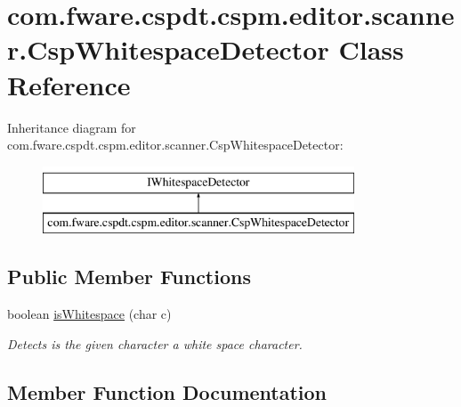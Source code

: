 \hypertarget{classcom_1_1fware_1_1cspdt_1_1cspm_1_1editor_1_1scanner_1_1_csp_whitespace_detector}{}\section{com.\+fware.\+cspdt.\+cspm.\+editor.\+scanner.\+Csp\+Whitespace\+Detector Class Reference}
\label{classcom_1_1fware_1_1cspdt_1_1cspm_1_1editor_1_1scanner_1_1_csp_whitespace_detector}
Inheritance diagram for com.\+fware.\+cspdt.\+cspm.\+editor.\+scanner.\+Csp\+Whitespace\+Detector\+:\begin{figure}[H]
\begin{center}
\leavevmode
\includegraphics[height=2.000000cm]{classcom_1_1fware_1_1cspdt_1_1cspm_1_1editor_1_1scanner_1_1_csp_whitespace_detector}
\end{center}
\end{figure}
\subsection*{Public Member Functions}
\begin{DoxyCompactItemize}
\item 
boolean \hyperlink{classcom_1_1fware_1_1cspdt_1_1cspm_1_1editor_1_1scanner_1_1_csp_whitespace_detector_ab058042f9f83da533d3a355f718c0a57}{is\+Whitespace} (char c)
\begin{DoxyCompactList}\small\item\em Detects is the given character a white space character. \end{DoxyCompactList}\end{DoxyCompactItemize}


\subsection{Member Function Documentation}
\mbox{\label{classcom_1_1fware_1_1cspdt_1_1cspm_1_1editor_1_1scanner_1_1_csp_whitespace_detector_ab058042f9f83da533d3a355f718c0a57}} 
